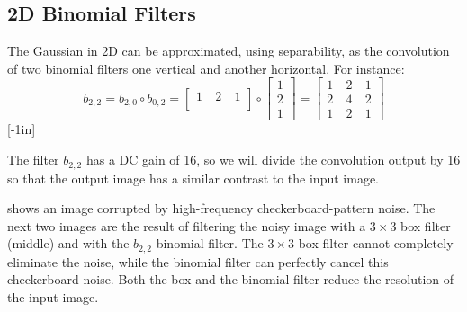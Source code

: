 \subsection{2D Binomial Filters}

The Gaussian in 2D can be approximated, using separability, as the convolution of two binomial filters one vertical and another horizontal. For instance:
\begin{equation}
b_{2,2} = b_{2,0} \circ b_{0,2} =  \begin{bmatrix}
  1 ~& 2 ~& 1 \\
\end{bmatrix}\circ \begin{bmatrix}
  1 \\
  2 \\
  1
\end{bmatrix}=
% 
\begin{bmatrix}
  1 ~& 2 ~& 1 \\
  2 ~& 4 ~& 2\\
  1~& 2 ~& 1
\end{bmatrix}
\end{equation}
[-1in]

The filter $b_{2,2}$ has a DC gain of 16, so we will divide the convolution output by 16 so that the output image has a similar contrast to the input image. 

\Fig{\ref{fig:boat_b_noise}} shows an image corrupted by high-frequency checkerboard-pattern noise. The next two images are the result of filtering the noisy image with a $3\times3$ box filter (middle) and with the $b_{2,2}$ binomial filter.
The $3\times3$ box filter cannot completely eliminate the noise, while the binomial filter can perfectly cancel this checkerboard noise. Both the box and the binomial filter reduce the resolution of the input image.

